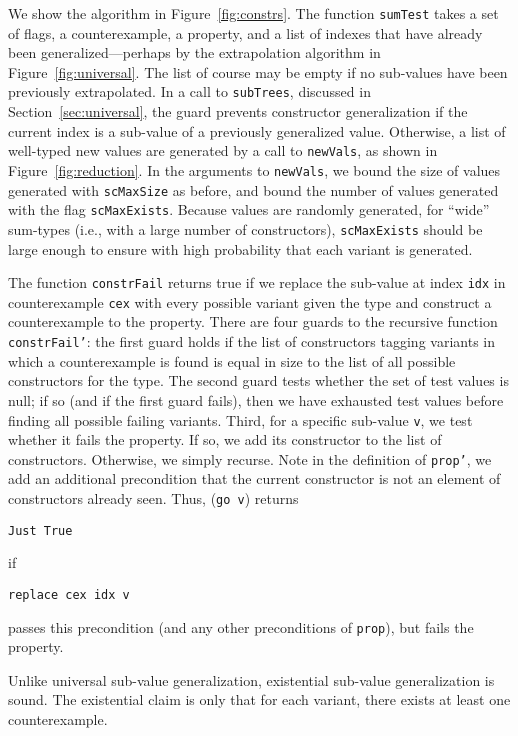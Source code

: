 \documentclass{sigplanconf}
\newenvironment{code}{\begin{alltt}\footnotesize}{\end{alltt}}
\newcommand{\ttp}[1]{\texttt{#1}}
\begin{document}
We show the algorithm in Figure~\ref{fig:constrs}.  The function \ttp{sumTest}
takes a set of flags, a counterexample, a property, and a list of indexes that
have already been generalized---perhaps by the extrapolation algorithm in
Figure~\ref{fig:universal}.  The list of course may be empty if no sub-values
have been previously extrapolated.  In a call to \ttp{subTrees}, discussed in
Section~\ref{sec:universal}, the guard prevents constructor generalization if
the current index is a sub-value of a previously generalized value.  Otherwise,
a list of well-typed new values are generated by a call to \ttp{newVals}, as
shown in Figure~\ref{fig:reduction}.  In the arguments to \ttp{newVals}, we
bound the size of values generated with \ttp{scMaxSize} as before, and bound the
number of values generated with the flag \ttp{scMaxExists}.  Because values are
randomly generated, for ``wide'' sum-types (i.e., with a large number of
constructors), \ttp{scMaxExists} should be large enough to ensure with high
probability that each variant is generated.

The function \ttp{constrFail} returns true if we replace the sub-value at index
\ttp{idx} in counterexample \ttp{cex} with every possible variant given the type
and construct a counterexample to the property.  There are four guards to the
recursive function \ttp{constrFail'}: the first guard holds if the list of
constructors tagging variants in which a counterexample is found is equal in
size to the list of all possible constructors for the type.  The second guard
tests whether the set of test values is null; if so (and if the first guard
fails), then we have exhausted test values before finding all possible failing
variants.  Third, for a specific sub-value \ttp{v}, we test whether it fails the
property.  If so, we add its constructor to the list of constructors.
Otherwise, we simply recurse.  Note in the definition of \ttp{prop'}, we add an
additional precondition that the current constructor is not an element of
constructors already seen.  Thus, (\ttp{go v}) returns
%
\begin{code}
\ttp{Just True}
\end{code}
%
\noindent
if
%
\begin{code}
\ttp{replace cex idx v}
\end{code}
%
passes this precondition (and any other preconditions of \ttp{prop}), but fails
the property.

Unlike universal sub-value generalization, existential sub-value generalization
is sound.  The existential claim is only that for each variant, there exists at
least one counterexample.
\end{document}
